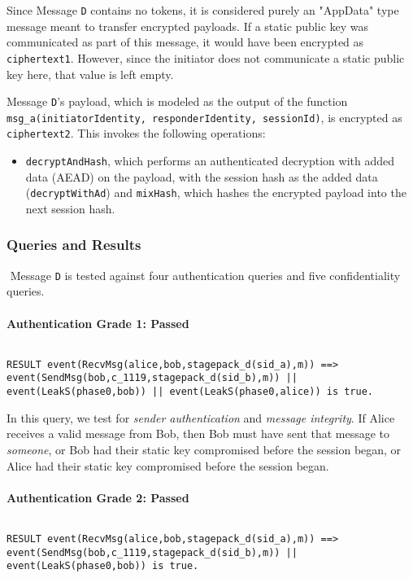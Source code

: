 Since Message \texttt{D} contains no tokens, it is considered purely an "AppData" type message meant to transfer encrypted payloads.
If a static public key was communicated as part of this message, it would have been encrypted as \texttt{ciphertext1}. However, since the initiator does not communicate a static public key here, that value is left empty.


Message \texttt{D}'s payload, which is modeled as the output of the function \texttt{msg\_a(initiatorIdentity, responderIdentity, sessionId)}, is encrypted as \texttt{ciphertext2}. This invokes the following operations:


\begin{itemize}

\item \texttt{decryptAndHash}, which performs an authenticated decryption with added data (AEAD) on the payload, with the session hash as the added data (\texttt{decryptWithAd}) and \texttt{mixHash}, which hashes the encrypted payload into the next session hash.

\end{itemize}
\subsubsection{Queries and Results}$ $
Message \texttt{D} is tested against four authentication queries and five confidentiality queries.
\paragraph{Authentication Grade 1: Passed}$ $
\begin{lstlisting}
RESULT event(RecvMsg(alice,bob,stagepack_d(sid_a),m)) ==> event(SendMsg(bob,c_1119,stagepack_d(sid_b),m)) || event(LeakS(phase0,bob)) || event(LeakS(phase0,alice)) is true.
\end{lstlisting}

In this query, we test for \emph{sender authentication} and \emph{message integrity}. If Alice receives a valid message from Bob, then Bob must have sent that message to \emph{someone}, or Bob had their static key compromised before the session began, or Alice had their static key compromised before the session began.


\paragraph{Authentication Grade 2: Passed}$ $
\begin{lstlisting}
RESULT event(RecvMsg(alice,bob,stagepack_d(sid_a),m)) ==> event(SendMsg(bob,c_1119,stagepack_d(sid_b),m)) || event(LeakS(phase0,bob)) is true.
\end{lstlisting}

